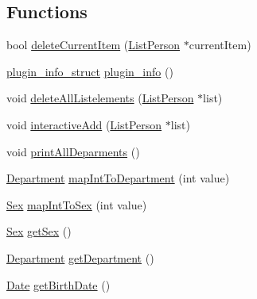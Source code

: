 \subsection*{Functions}
\begin{DoxyCompactItemize}
\item 
bool \hyperlink{namespace_h_t_w_1_1_a_i_1_1_beleg_1_1_plugin_aa2e42bf742f3a00c5146dbfcc289f494}{delete\-Current\-Item} (\hyperlink{struct_h_t_w_1_1_a_i_1_1_beleg_1_1_list_person}{List\-Person} $\ast$current\-Item)
\item 
\hyperlink{struct_h_t_w_1_1_a_i_1_1_beleg_1_1_plugin_1_1plugin__info__struct}{plugin\-\_\-info\-\_\-struct} \hyperlink{namespace_h_t_w_1_1_a_i_1_1_beleg_1_1_plugin_a09f048dbac5b6f35fca9900b50aa9224}{plugin\-\_\-info} ()
\item 
void \hyperlink{namespace_h_t_w_1_1_a_i_1_1_beleg_1_1_plugin_ae36dcd51a2895898bcfe901ee0a18794}{delete\-All\-Listelements} (\hyperlink{struct_h_t_w_1_1_a_i_1_1_beleg_1_1_list_person}{List\-Person} $\ast$list)
\item 
void \hyperlink{namespace_h_t_w_1_1_a_i_1_1_beleg_1_1_plugin_a5f3883f9fd540c8e124e600c3f685d68}{interactive\-Add} (\hyperlink{struct_h_t_w_1_1_a_i_1_1_beleg_1_1_list_person}{List\-Person} $\ast$list)
\item 
void \hyperlink{namespace_h_t_w_1_1_a_i_1_1_beleg_1_1_plugin_a6c113d955529ca0ca951931faa567d9b}{print\-All\-Deparments} ()
\item 
\hyperlink{namespace_h_t_w_1_1_a_i_1_1_beleg_a1131bbbd225fb53b2082a014e0f6e940}{Department} \hyperlink{namespace_h_t_w_1_1_a_i_1_1_beleg_1_1_plugin_a56005bf541ac9b569f47528123d44c95}{map\-Int\-To\-Department} (int value)
\item 
\hyperlink{namespace_h_t_w_1_1_a_i_1_1_beleg_a79f3a46a934454a934cc7ec60d4f2e2c}{Sex} \hyperlink{namespace_h_t_w_1_1_a_i_1_1_beleg_1_1_plugin_a1ce56c26f06b01b36bbd2304130e37a7}{map\-Int\-To\-Sex} (int value)
\item 
\hyperlink{namespace_h_t_w_1_1_a_i_1_1_beleg_a79f3a46a934454a934cc7ec60d4f2e2c}{Sex} \hyperlink{namespace_h_t_w_1_1_a_i_1_1_beleg_1_1_plugin_a3bc530ac0537085e8e14edff9a56dd47}{get\-Sex} ()
\item 
\hyperlink{namespace_h_t_w_1_1_a_i_1_1_beleg_a1131bbbd225fb53b2082a014e0f6e940}{Department} \hyperlink{namespace_h_t_w_1_1_a_i_1_1_beleg_1_1_plugin_a40703d1f0fd7d387a77f32c03f25f854}{get\-Department} ()
\item 
\hyperlink{struct_h_t_w_1_1_a_i_1_1_beleg_1_1_date}{Date} \hyperlink{namespace_h_t_w_1_1_a_i_1_1_beleg_1_1_plugin_a1597552991708ac3989b9bd43a473d07}{get\-Birth\-Date} ()

\end{DoxyCompactItemize}
